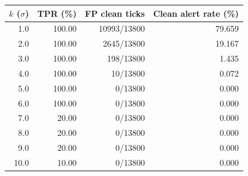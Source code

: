 \begin{tabular}{@{}rrrr@{}}
\toprule
\textbf{$k$ ($\sigma$)} & \textbf{TPR (\%)} & \textbf{FP clean ticks} & \textbf{Clean alert rate (\%)} \\
\midrule
1.0 & 100.00 & 10993/13800 & 79.659 \\
2.0 & 100.00 & 2645/13800 & 19.167 \\
3.0 & 100.00 & 198/13800 & 1.435 \\
4.0 & 100.00 & 10/13800 & 0.072 \\
5.0 & 100.00 & 0/13800 & 0.000 \\
6.0 & 100.00 & 0/13800 & 0.000 \\
7.0 & 20.00 & 0/13800 & 0.000 \\
8.0 & 20.00 & 0/13800 & 0.000 \\
9.0 & 20.00 & 0/13800 & 0.000 \\
10.0 & 10.00 & 0/13800 & 0.000 \\
\bottomrule
\end{tabular}
